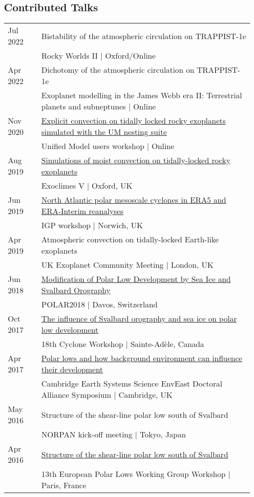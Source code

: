 \documentclass[a4paper, 11pt]{article}
\begin{document}
\subsection*{Contributed Talks}
\begin{tabularx}{\linewidth}{@{}l X@{}}
Jul 2022 & Bistability of the atmospheric circulation on TRAPPIST-1e \\ & Rocky Worlds II | Oxford/Online \\
Apr 2022 & Dichotomy of the atmospheric circulation on TRAPPIST-1e \\ & Exoplanet modelling in the James Webb era II: Terrestrial planets and subneptunes | Online \\
Nov 2020 & \href{https://slides.com/denissergeev/2020-11-10-um-workshop-sergeev}{Explicit convection on tidally locked rocky exoplanets simulated with the UM nesting suite} \\ & Unified Model users workshop | Online \\
Aug 2019 & \href{https://youtu.be/9nGIpQiPwDs}{Simulations of moist convection on tidally-locked rocky exoplanets} \\ & Exoclimes V | Oxford, UK \\
Jun 2019 & \href{https://speakerdeck.com/dennissergeev/north-atlantic-polar-mesoscale-cyclones-in-era5-and-era-interim-reanalyses}{North Atlantic polar mesoscale cyclones in ERA5 and ERA-Interim reanalyses} \\ & IGP workshop | Norwich, UK \\
Apr 2019 & Atmospheric convection on tidally-locked Earth-like exoplanets \\ & UK Exoplanet Community Meeting | London, UK \\
Jun 2018 & \href{https://speakerdeck.com/dennissergeev/polar2018}{Modification of Polar Low Development by Sea Ice and Svalbard Orography} \\ & POLAR2018 | Davos, Switzerland \\
Oct 2017 & \href{https://figshare.com/articles/The_influence_of_Svalbard_orography_and_sea_ice_on_polar_low_development/5510416}{The influence of Svalbard orography and sea ice on polar low development} \\ & 18th Cyclone Workshop | Sainte-Adèle, Canada \\
Apr 2017 & \href{http://dennissergeev.github.io/ceeda2017}{Polar lows and how background environment can influence their development} \\ & Cambridge Earth Systems Science EnvEast Doctoral Alliance Symposium | Cambridge, UK \\
May 2016 & Structure of the shear-line polar low south of Svalbard \\ & NORPAN kick-off meeting | Tokyo, Japan \\
Apr 2016 & \href{http://slides.com/denissergeev/deck}{Structure of the shear-line polar low south of Svalbard} \\ & 13th European Polar Lows Working Group Workshop | Paris, France \\
\end{tabularx}
\vspace{1ex}
\end{document}
